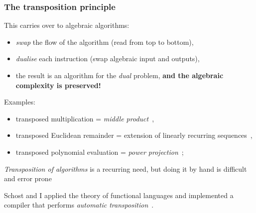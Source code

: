 \documentclass[10pt]{beamer}
\newcommand{\0}{\mathcal{O}}  %
\begin{document}
\begin{frame}
  \frametitle{The transposition principle}

  This carries over to algebraic algorithms:
  \begin{itemize}
  \item \emph{swap} the flow of the algorithm (read from top to bottom),
  \item \emph{dualise} each instruction (swap algebraic input and outputs),
  \item the result is an algorithm for the \emph{dual} problem,
    \textbf{and the algebraic complexity is preserved!}
  \end{itemize}

  Examples:
  \begin{itemize}
  \item transposed multiplication = \emph{middle
      product}~\cite{hanrot+quercia+zimmermann},
  \item transposed Euclidean remainder = extension of linearly
    recurring sequences~\cite{bostan+lecerf+schost:tellegen},
  \item transposed polynomial evaluation = \emph{power
      projection}~\cite{shoup94,shoup95,shoup99,bostan+salvy+schost03};
  \end{itemize}

  \emph{Transposition of algorithms} is a recurring need, but doing it
  by hand is difficult and error prone

  \begin{center}
    \large Schost and I applied the theory of functional languages and
    implemented a compiler that performs \emph{automatic
      transposition}~\cite{df+schost10}.
  \end{center}
\end{frame}

\end{document}

